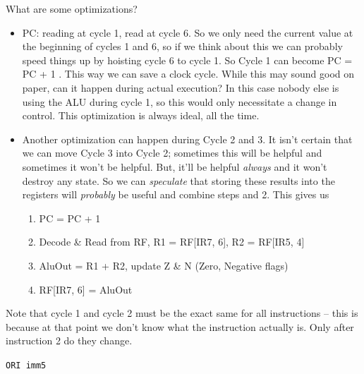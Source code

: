 \documentclass[../notes.tex]{subfiles}
\begin{document}
What are some optimizations?

\begin{itemize}
	\item PC: reading at cycle 1, read at cycle 6. So we only need the current value at the beginning of cycles 1 and 6, so if we think about this we can probably speed things up by hoisting cycle 6 to cycle 1. So Cycle 1 can become PC = PC + 1 . This way we can save a clock cycle. While this may sound good on paper, can it happen during actual execution? In this case nobody else is using the ALU during cycle 1, so this would only necessitate a change in control. This optimization is always ideal, all the time.
	\item Another optimization can happen during Cycle 2 and 3. It isn't certain that we can move Cycle 3 into Cycle 2; sometimes this will be helpful and sometimes it won't be helpful. But, it'll be helpful \textit{always} and it won't destroy any state. So we can \textit{speculate} that storing these results into the registers will \textit{probably} be useful and combine steps and 2. This gives us 
		\begin{enumerate}
			\item  PC = PC + 1
			\item  Decode \& Read from RF, R1 = RF[IR7, 6], R2 = RF[IR5, 4]
			\item  AluOut = R1 + R2, update Z \& N (Zero, Negative flags)
			\item  RF[IR7, 6] = AluOut
		\end{enumerate}
\end{itemize}


\begin{blockquote}
	Note that cycle 1 and cycle 2 must be the exact same for all instructions -- this is because at that point we don't know what the instruction actually is. Only after instruction 2 do they change.
\end{blockquote}


\texttt{ORI imm5}
\end{document}

